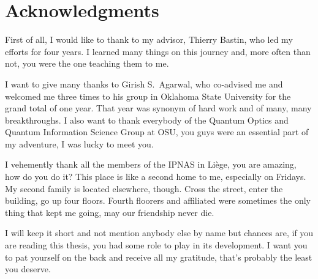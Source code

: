 \chapter*{Acknowledgments}

First of all, I would like to thank to my advisor, Thierry Bastin, who led my efforts for four years. I learned many things on this journey and, more often than not, you were the one teaching them to me.

I want to give many thanks to Girish S.~Agarwal, who co-advised me and welcomed me three times to his group in Oklahoma State University for the grand total of one year. That year was synonym of hard work and of many, many breakthroughs. I also want to thank everybody of the Quantum Optics and Quantum Information Science Group at OSU, you guys were an essential part of my adventure, I was lucky to meet you.

I vehemently thank all the members of the IPNAS in Li\`ege, you are amazing, how do you do it? This place is like a second home to me, especially on Fridays. My second family is located elsewhere, though. Cross the street, enter the building, go up four floors. Fourth floorers and affiliated were sometimes the only thing that kept me going, may our friendship never die.

I will keep it short and not mention anybody else by name but chances are, if you are reading this thesis, you had some role to play in its development. I want you to pat yourself on the back and receive all my  gratitude, that's probably the least you deserve.

